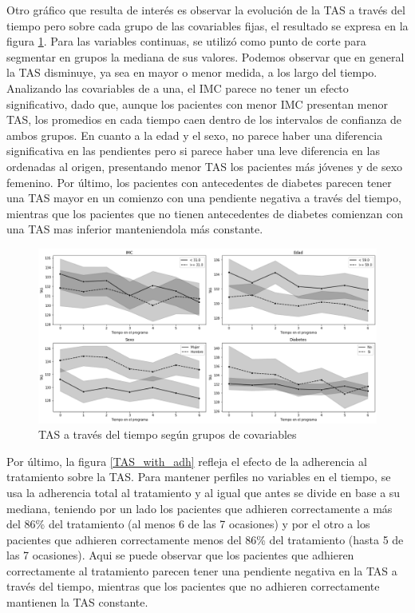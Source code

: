 \documentclass[spanish]{article}
\numberwithin{figure}{subsection}
\numberwithin{equation}{subsection}
\numberwithin{table}{subsection}
\begin{document}
Otro gráfico que resulta de interés es observar la evolución de la TAS a través
del tiempo pero sobre cada grupo de las covariables fijas, el resultado se
expresa en la figura \ref{TAS_with_covs}. Para las variables continuas, se
utilizó como punto de corte para segmentar en grupos la mediana de sus valores.
Podemos observar que en general la TAS disminuye, ya sea en mayor o menor
medida, a los largo del tiempo. Analizando las covariables de a una, el IMC
parece no tener un efecto significativo, dado que, aunque los pacientes con
menor IMC presentan menor TAS, los promedios en cada tiempo caen dentro de los
intervalos de confianza de ambos grupos. En cuanto a la edad y el sexo, no
parece haber una diferencia significativa en las pendientes pero si parece haber
una leve diferencia en las ordenadas al origen, presentando menor TAS los
pacientes más jóvenes y de sexo femenino. Por último, los pacientes con
antecedentes de diabetes parecen tener una TAS mayor en un comienzo con una
pendiente negativa a través del tiempo, mientras que los pacientes que no tienen
antecedentes de diabetes comienzan con una TAS mas inferior manteniendola más
constante.

\begin{figure}[H]
	\centering
	\includegraphics[scale=0.4]{img/TAS_vs_tpo_with_covs.png}
	\caption{TAS a través del tiempo según grupos de covariables}
	\label{TAS_with_covs}
\end{figure}

Por último, la figura \ref{TAS_with_adh} refleja el efecto de la adherencia al
tratamiento sobre la TAS. Para mantener perfiles no variables en el tiempo, se
usa la adherencia total al tratamiento y al igual que antes se divide en base a
su mediana, teniendo por un lado los pacientes que adhieren correctamente a más
del 86\% del tratamiento (al menos 6 de las 7 ocasiones) y por el otro a los
pacientes que adhieren correctamente menos del 86\% del tratamiento (hasta 5 de
las 7 ocasiones). Aqui se puede observar que los pacientes que adhieren
correctamente al tratamiento parecen tener una pendiente negativa en la TAS a
través del tiempo, mientras que los pacientes que no adhieren correctamente
mantienen la TAS constante.
\end{document}
